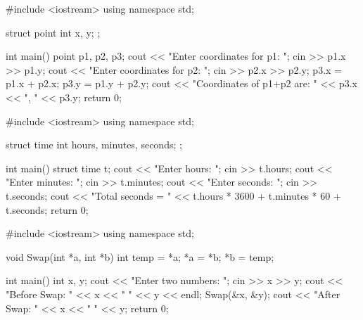 \codelabel

\begin{code}
#include <iostream>
using namespace std;

struct point { int x, y; };

int main() {
    point p1, p2, p3;
    cout << "Enter coordinates for p1: "; cin >> p1.x >> p1.y;
    cout << "Enter coordinates for p2: "; cin >> p2.x >> p2.y;
    p3.x = p1.x + p2.x; p3.y = p1.y + p2.y;
    cout << "Coordinates of p1+p2 are: " << p3.x << ", " << p3.y;
    return 0;
}
\end{code}

\outputlabel
{}


\codelabel

\begin{code}
#include <iostream>
using namespace std;

struct time { int hours, minutes, seconds; };

int main() {
    struct time t;
    cout << "Enter hours: "; cin >> t.hours;
    cout << "Enter minutes: "; cin >> t.minutes;
    cout << "Enter seconds: "; cin >> t.seconds;
    cout << "Total seconds = " << t.hours * 3600 + t.minutes * 60 + t.seconds;
    return 0;
}
\end{code}

\outputlabel
{}


\codelabel

\begin{code}
#include <iostream>
using namespace std;

void Swap(int *a, int *b) {
    int temp = *a; *a = *b; *b = temp;
}

int main() {
    int x, y;
    cout << "Enter two numbers: "; cin >> x >> y;
    cout << "Before Swap: " << x << " " << y << endl;
    Swap(&x, &y);
    cout << "After Swap: " << x << " " << y;
    return 0;
}
\end{code}

